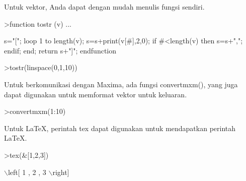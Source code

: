 \documentclass[12pt,arial,letterpaper]{book}
\begin{document}
\begin{eulercomment}
\begin{eulercomment}
\begin{eulercomment}
\begin{eulercomment}
\begin{eulercomment}
\begin{eulercomment}
\begin{eulercomment}
\begin{eulercomment}
\begin{eulercomment}
\begin{eulercomment}
\begin{eulercomment}
\begin{eulercomment}
\begin{eulercomment}
\begin{eulercomment}
\begin{eulercomment}
\begin{eulercomment}
\begin{eulercomment}
\begin{eulercomment}
\begin{eulercomment}
\begin{eulercomment}
\begin{eulercomment}
\begin{eulercomment}
\begin{eulercomment}
\begin{eulercomment}
\begin{eulercomment}
\begin{eulercomment}
\begin{eulercomment}
\begin{eulercomment}
\begin{eulercomment}
\begin{eulercomment}
\begin{eulercomment}
\begin{eulercomment}
\begin{eulercomment}
\begin{eulercomment}
\begin{eulercomment}
\begin{eulercomment}
\begin{eulercomment}
Untuk vektor, Anda dapat dengan mudah menulis fungsi sendiri.
\end{eulercomment}
\begin{eulerprompt}
>function tostr (v) ...
\end{eulerprompt}
\begin{eulerudf}
  s="[";
  loop 1 to length(v);
     s=s+print(v[#],2,0);
     if #<length(v) then s=s+","; endif;
  end;
  return s+"]";
  endfunction
\end{eulerudf}
\begin{eulerprompt}
>tostr(linspace(0,1,10))
\end{eulerprompt}
\begin{euleroutput}
  [0.00,0.10,0.20,0.30,0.40,0.50,0.60,0.70,0.80,0.90,1.00]
\end{euleroutput}
\begin{eulercomment}
Untuk berkomunikasi dengan Maxima, ada fungsi convertmxm(), yang juga
dapat digunakan untuk memformat vektor untuk keluaran.
\end{eulercomment}
\begin{eulerprompt}
>convertmxm(1:10)
\end{eulerprompt}
\begin{euleroutput}
  [1,2,3,4,5,6,7,8,9,10]
\end{euleroutput}
\begin{eulercomment}
Untuk LaTeX, perintah tex dapat digunakan untuk mendapatkan perintah
LaTeX.
\end{eulercomment}
\begin{eulerprompt}
>tex(&[1,2,3])
\end{eulerprompt}
\begin{euleroutput}
  \(\backslash\)left[ 1 , 2 , 3 \(\backslash\)right] 
\end{euleroutput}

\end{eulercomment}
\end{eulercomment}
\end{eulercomment}
\end{eulercomment}
\end{eulercomment}
\end{eulercomment}
\end{eulercomment}
\end{eulercomment}
\end{eulercomment}
\end{eulercomment}
\end{eulercomment}
\end{eulercomment}
\end{eulercomment}
\end{eulercomment}
\end{eulercomment}
\end{eulercomment}
\end{eulercomment}
\end{eulercomment}
\end{eulercomment}
\end{eulercomment}
\end{eulercomment}
\end{eulercomment}
\end{eulercomment}
\end{eulercomment}
\end{eulercomment}
\end{eulercomment}
\end{eulercomment}
\end{eulercomment}
\end{eulercomment}
\end{eulercomment}
\end{eulercomment}
\end{eulercomment}
\end{eulercomment}
\end{eulercomment}
\end{eulercomment}
\end{eulercomment}
\end{document}
